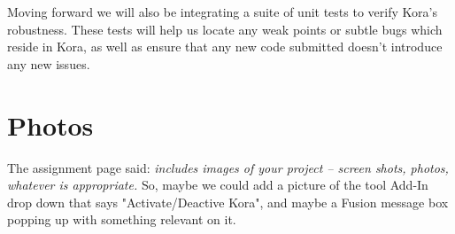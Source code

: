 \documentclass[onecolumn, draftclsnofoot,10pt, compsoc]{IEEEtran}
\begin{document}
		Moving forward we will also be integrating a suite of unit tests to verify Kora's robustness.
		These tests will help us locate any weak points or subtle bugs which reside in Kora, as well as ensure that any new code submitted doesn't introduce any new issues.
		


\section{Photos}
	The assignment page said: \textit{includes images of your project -- screen shots, photos, whatever is appropriate.}
	So, maybe we could add a picture of the tool Add-In drop down that says "Activate/Deactive Kora", and maybe a Fusion message box popping up with something relevant on it.
\end{document}
